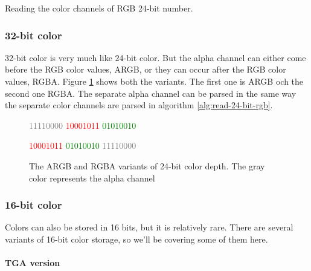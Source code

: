 
  \begin{algorithm}[H]
    \caption{Reading the color channels of RGB 24-bit number.}
    \label{alg:read-24-bit-rgb}
    \begin{algorithmic}[1]
    \end{algorithmic}
  \end{algorithm}

  \subsubsection{32-bit color}

  32-bit color is very much like 24-bit color. But the alpha channel
  can either come before the RGB color values, ARGB, or
  they can occur after the RGB color values, RGBA. Figure
  \ref{fig:32-bit-colors-bits} shows both the variants. The first one
  is ARGB och the second one RGBA. The separate alpha channel can be
  parsed in the same way the separate color channels are parsed in
  algorithm \ref{alg:read-24-bit-rgb}.

  \begin{figure}
    \centering
    {\Large%
      \textcolor{gray}{11110000}%
      \textcolor{red}{10001011}%
      \textcolor{green}{01010010}%
      \textcolor{blue}{\fullbyte}

      \textcolor{red}{10001011}%
      \textcolor{green}{01010010}%
      \textcolor{blue}{\fullbyte}%
      \textcolor{gray}{11110000}%
    }

    \caption{The ARGB and RGBA variants of 24-bit color depth. The
      gray color represents the alpha channel }
    \label{fig:32-bit-colors-bits}
  \end{figure}

  \subsubsection{16-bit color}

  Colors can also be stored in 16 bits, but it is relatively
  rare. There are several variants of 16-bit color storage, so we'll
  be covering some of them here.

  \paragraph{TGA version}

